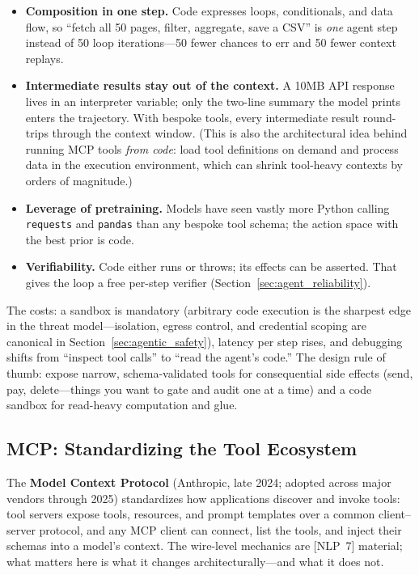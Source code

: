 \begin{itemize}
    \item \textbf{Composition in one step.} Code expresses loops, conditionals, and data flow, so ``fetch all 50 pages, filter, aggregate, save a CSV'' is \textit{one} agent step instead of 50 loop iterations---50 fewer chances to err and 50 fewer context replays.
    \item \textbf{Intermediate results stay out of the context.} A 10MB API response lives in an interpreter variable; only the two-line summary the model prints enters the trajectory. With bespoke tools, every intermediate result round-trips through the context window. (This is also the architectural idea behind running MCP tools \textit{from code}: load tool definitions on demand and process data in the execution environment, which can shrink tool-heavy contexts by orders of magnitude.)
    \item \textbf{Leverage of pretraining.} Models have seen vastly more Python calling \texttt{requests} and \texttt{pandas} than any bespoke tool schema; the action space with the best prior is code.
    \item \textbf{Verifiability.} Code either runs or throws; its effects can be asserted. That gives the loop a free per-step verifier (Section~\ref{sec:agent_reliability}).
\end{itemize}

The costs: a sandbox is mandatory (arbitrary code execution is the sharpest edge in the threat model---isolation, egress control, and credential scoping are canonical in Section~\ref{sec:agentic_safety}), latency per step rises, and debugging shifts from ``inspect tool calls'' to ``read the agent's code.'' The design rule of thumb: expose narrow, schema-validated tools for consequential side effects (send, pay, delete---things you want to gate and audit one at a time) and a code sandbox for read-heavy computation and glue.

\subsection{MCP: Standardizing the Tool Ecosystem}

The \textbf{Model Context Protocol} (Anthropic, late 2024; adopted across major vendors through 2025) standardizes how applications discover and invoke tools: tool servers expose tools, resources, and prompt templates over a common client--server protocol, and any MCP client can connect, list the tools, and inject their schemas into a model's context. The wire-level mechanics are [NLP~7] material; what matters here is what it changes architecturally---and what it does not.

